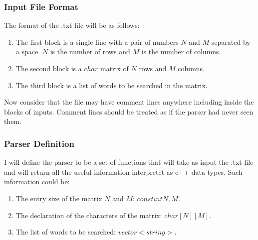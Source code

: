 \documentclass{extarticle}
\newcommand{\code}[1]{$#1$} %
\begin{document}
\subsubsection{Input File Format}
The format of the .txt file will be as follows:
    \begin{enumerate}
        \item The first block is a single line with a pair of numbers $N$ and $M$ separated by a space. $N$ is the number of rows and $M$ is the number of columns.
        \item The second block is a \code{char} matrix of $N$ rows and $M$ columns.
        \item The third block is a list of words to be searched in the matrix.
    \end{enumerate}
Now consider that the file may have comment lines anywhere including inside the blocks of inputs. Comment lines should be treated as if the parser had never seen them.

\subsubsection{Parser Definition}
I will define the parser to be a set of functions that will take as input the .txt file and will return all the useful information interpretet as c++ data types. Such information could be:
    \begin{enumerate}
        \item The entry size of the matrix $N$ and $M$: \code{const int N, M}.
        \item The declaration of the characters of the matrix: \code{char[N][M]}.
        \item The list of words to be searched: \code{vector<string>}.
    \end{enumerate}
\end{document}
